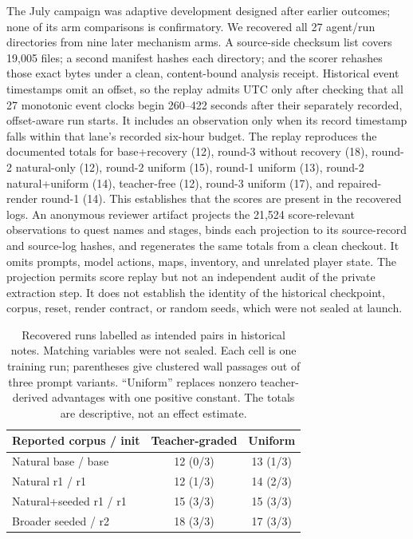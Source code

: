\documentclass[11pt,a4paper]{article}
\begin{document}
The July campaign was adaptive development designed after earlier outcomes;
none of its arm comparisons is confirmatory. We recovered all 27 agent/run
directories from nine later mechanism arms. A
source-side checksum list covers 19,005 files; a second manifest hashes each
directory; and the scorer rehashes those exact bytes under a clean,
content-bound analysis receipt. Historical event timestamps omit an offset, so
the replay admits UTC only after checking that all 27 monotonic event clocks
begin 260--422 seconds after their separately recorded, offset-aware run starts. It
includes an observation only when its record timestamp falls within that
lane's recorded six-hour budget. The replay
reproduces the documented totals for base+recovery (12), round-3 without
recovery (18), round-2 natural-only (12), round-2 uniform (15), round-1 uniform
(13), round-2 natural+uniform (14), teacher-free (12), round-3 uniform (17),
and repaired-render round-1 (14). This establishes that the scores are present
in the recovered logs. An anonymous reviewer artifact projects the 21,524
score-relevant observations to quest names and stages, binds each projection
to its source-record and source-log hashes, and regenerates the same totals
from a clean checkout. It omits prompts, model actions, maps, inventory, and
unrelated player state. The projection permits score replay but not an
independent audit of the private extraction step. It
does not establish the identity of the historical checkpoint, corpus, reset,
render contract, or random seeds, which were not sealed at launch.

\begin{table}[t]
\caption{Recovered runs labelled as intended pairs in historical notes. Matching
variables were not sealed. Each cell is one training run; parentheses give
clustered wall passages out of three prompt variants.
``Uniform'' replaces nonzero teacher-derived advantages with one positive
constant. The totals are descriptive, not an effect estimate.}
\label{tab:matched-controls}
\centering
\small
\setlength{\tabcolsep}{3pt}
\begin{tabular}{@{}lcc@{}}
\toprule
Reported corpus / init & Teacher-graded & Uniform \\
\midrule
Natural base / base & 12 (0/3) & 13 (1/3) \\
Natural r1 / r1 & 12 (1/3) & 14 (2/3) \\
Natural+seeded r1 / r1 & 15 (3/3) & 15 (3/3) \\
Broader seeded / r2 & 18 (3/3) & 17 (3/3) \\
\bottomrule
\end{tabular}
\end{table}
\end{document}
